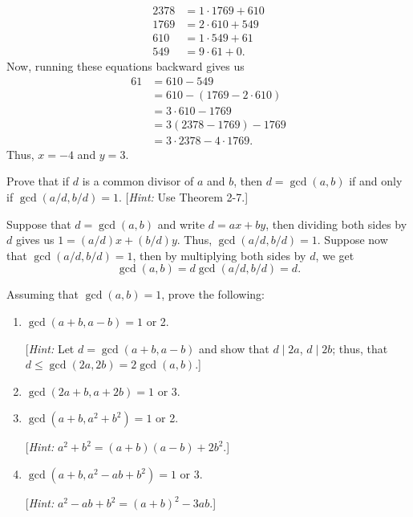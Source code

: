 \begin{solution}
\begin{enumerate}
        \begin{align*}
            2378 &= 1\cdot 1769 + 610 \\
            1769 &= 2\cdot 610 + 549 \\
            610 &= 1 \cdot 549 + 61 \\
            549 &= 9 \cdot 61 + 0.
        \end{align*}
        Now, running these equations backward gives us 
        \begin{align*}
            61 &= 610 - 549 \\
            &= 610 - (1769 - 2 \cdot 610) \\
            &= 3\cdot 610 - 1769 \\
            &= 3(2378 - 1769) - 1769 \\
            &= 3 \cdot 2378 - 4 \cdot 1769.
        \end{align*}
        Thus, $x = -4$ and $y = 3$.
    \end{enumerate}
\end{solution}

\begin{exercise}
    Prove that if $d$ is a common divisor of $a$ and $b$, then $d = \gcd(a,b)$ if and only if $\gcd(a/d, b/d) = 1$. [\textit{Hint:} Use Theorem 2-7.] \\
\end{exercise}

\begin{solution}
    Suppose that $d = \gcd(a,b)$ and write $d = ax + by$, then dividing both sides by $d$ gives us $1 = (a/d)x + (b/d)y$. Thus, $\gcd(a/d, b/d) = 1$. Suppose now that $\gcd(a/d, b/d) = 1$, then by multiplying both sides by $d$, we get
    $$\gcd(a, b) = d \gcd(a/d, b/d) = d.$$
\end{solution}

\begin{exercise}
    Assuming that $\gcd(a,b) = 1$, prove the following:
    \begin{enumerate}
        \item $\gcd(a+b, a-b) = 1$ or 2.
        
        [\textit{Hint:} Let $d = \gcd(a+b, a-b)$ and show that $d \mid 2a$, $d\mid 2b$; thus, that $d \leq \gcd(2a, 2b) = 2\gcd(a,b)$.]
        \item $\gcd(2a + b, a + 2b) = 1$ or 3.
        \item $\gcd(a + b, a^2 + b^2) = 1$ or 2.
        
        [\textit{Hint:} $a^2 + b^2 = (a + b)(a - b) + 2b^2$.]
        \item $\gcd(a + b, a^2 - ab + b^2) = 1$ or 3.
        
        [\textit{Hint:} $a^2 - ab + b^2 = (a + b)^2 - 3ab$.]
    \end{enumerate}
\end{exercise}

